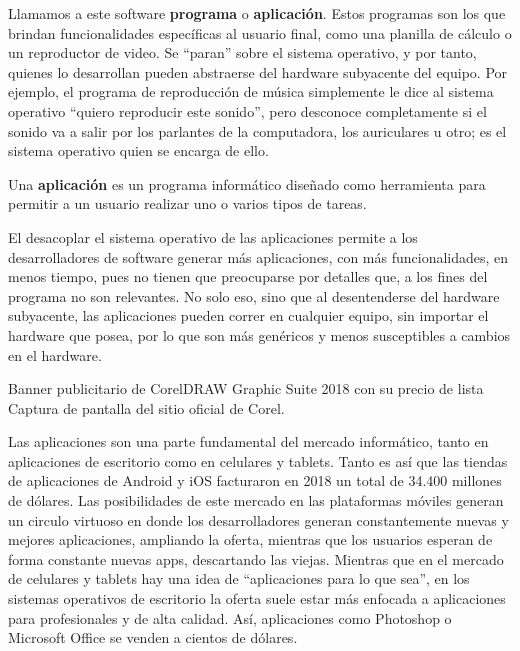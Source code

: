 Llamamos a este software \textbf{programa} o \textbf{aplicación}. Estos
programas son los que brindan funcionalidades específicas al usuario final, como
una planilla de cálculo o un reproductor de video. Se ``paran'' sobre el sistema
operativo, y por tanto, quienes lo desarrollan pueden abstraerse del hardware
subyacente del equipo. Por ejemplo, el programa de reproducción de música
simplemente le dice al sistema operativo ``quiero reproducir este sonido'', pero
desconoce completamente si el sonido va a salir por los parlantes de la
computadora, los auriculares u otro; es el sistema operativo quien se encarga de
ello.

\begin{definition} Una \textbf{aplicación} es un programa
    informático diseñado como herramienta para permitir a un usuario realizar
    uno o varios tipos de tareas.\autocite{rae_aplicacion_2014}
\end{definition}

El desacoplar el sistema operativo de las aplicaciones permite a los
desarrolladores de software generar más aplicaciones, con más funcionalidades,
en menos tiempo, pues no tienen que preocuparse por detalles que, a los fines
del programa no son relevantes. No solo eso, sino que al desentenderse del
hardware subyacente, las aplicaciones pueden correr en cualquier equipo, sin
importar el hardware que posea, por lo que son más genéricos y menos
susceptibles a cambios en el hardware.

{Banner publicitario de CorelDRAW Graphic Suite 2018 con su precio de lista}
{Captura de pantalla del sitio oficial de Corel.}

Las aplicaciones son una parte fundamental del mercado informático, tanto en
aplicaciones de escritorio como en celulares y tablets. Tanto es así que las
tiendas de aplicaciones de Android y iOS facturaron en 2018 un total de 34.400
millones de dólares. Las posibilidades de este mercado en las plataformas
móviles generan un circulo virtuoso en donde los desarrolladores generan
constantemente nuevas y mejores aplicaciones, ampliando la oferta, mientras que
los usuarios esperan de forma constante nuevas apps, descartando las viejas.
Mientras que en el mercado de celulares y tablets hay una idea de ``aplicaciones
para lo que sea'', en los sistemas operativos de escritorio la oferta suele
estar más enfocada a aplicaciones para profesionales y de alta calidad. Así,
aplicaciones como Photoshop o Microsoft Office se venden a cientos de dólares.


